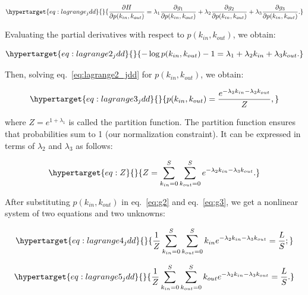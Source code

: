 \documentclass[11pt]{article}
\begin{document}
\begin{equation}\protect\hypertarget{eq:lagrange_jdd}{}{\frac{\partial H}{\partial p(k_{in},k_{out})} = \lambda_1 \frac{\partial g_1}{\partial p(k_{in},k_{out})} + \lambda_2 \frac{\partial g_2}{\partial p(k_{in},k_{out})}+ \lambda_3 \frac{\partial g_3}{\partial p(k_{in},k_{out})}.}\label{eq:lagrange_jdd}\end{equation}

Evaluating the partial derivatives with respect to
\(p(k_{in},k_{out})\), we obtain:

\begin{equation}\protect\hypertarget{eq:lagrange2_jdd}{}{-\log p(k_{in},k_{out}) - 1 = \lambda_1 + \lambda_2 k_{in} + \lambda_3 k_{out}.}\label{eq:lagrange2_jdd}\end{equation}

Then, solving eq.~\ref{eq:lagrange2_jdd} for \(p(k_{in},k_{out})\), we
obtain:

\begin{equation}\protect\hypertarget{eq:lagrange3_jdd}{}{p(k_{in},k_{out}) = \frac{e^{-\lambda_2k_{in}-\lambda_3k_{out}}}{Z},}\label{eq:lagrange3_jdd}\end{equation}

where \(Z = e^{1+\lambda_1}\) is called the partition function. The
partition function ensures that probabilities sum to 1 (our
normalization constraint). It can be expressed in terms of \(\lambda_2\)
and \(\lambda_3\) as follows:

\begin{equation}\protect\hypertarget{eq:Z}{}{Z = \sum_{k_{in}=0}^S\sum_{k_{out}=0}^S e^{-\lambda_2k_{in}-\lambda_3k_{out}}.}\label{eq:Z}\end{equation}

After substituting \(p(k_{in},k_{out})\) in eq.~\ref{eq:g2} and
eq.~\ref{eq:g3}, we get a nonlinear system of two equations and two
unknowns:

\begin{equation}\protect\hypertarget{eq:lagrange4_jdd}{}{\frac{1}{Z}\sum_{k_{in}=0}^S\sum_{k_{out}=0}^S k_{in} e^{-\lambda_2k_{in}-\lambda_3k_{out}}  = \frac{L}{S};}\label{eq:lagrange4_jdd}\end{equation}

\begin{equation}\protect\hypertarget{eq:lagrange5_jdd}{}{\frac{1}{Z}\sum_{k_{in}=0}^S\sum_{k_{out}=0}^S k_{out} e^{-\lambda_2k_{in}-\lambda_3k_{out}}  = \frac{L}{S}.}\label{eq:lagrange5_jdd}\end{equation}
\end{document}
